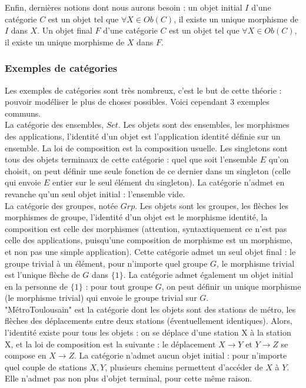 \documentclass{article}
\begin{document}
Enfin, dernières notions dont nous aurons besoin : un objet initial $I$ d'une catégorie $C$
est un objet tel que $ \forall X \in Ob(C)$, il existe un unique morphisme de $I$ dans $X$. Un objet final $F$ d'une catégorie $C$ est un objet tel que $ \forall X \in Ob(C)$, il existe un unique morphisme de $ X$ dans $F$.

\subsubsection{Exemples de catégories}

Les exemples de catégories sont très nombreux, c'est le but de cette théorie : pouvoir modéliser le plus de choses possibles. Voici cependant 3 exemples communs. \\  
La catégorie des ensembles, $Set$. Les objets sont des ensembles, les morphismes des applications, l'identité d'un objet est l'application identité définie sur un ensemble. La loi de composition est la composition usuelle. Les singletons sont tous des objets terminaux de cette catégorie : quel que soit l'ensemble $E$ qu'on choisit, on peut définir une seule fonction de ce dernier dans un singleton (celle qui envoie $E$ entier sur le seul élément du singleton). La catégorie n'admet en revanche qu'un seul objet initial : l'ensemble vide.  
\\ 
La catégorie des groupes, notée $Grp$. Les objets sont les groupes, les flèches les morphismes de groupe, l'identité d'un objet est le morphisme identité, la composition est celle des morphismes (attention, syntaxtiquement ce n'est pas celle des applications, puisqu'une composition de morphisme est un morphisme, et non pas une simple application). Cette catégorie admet un seul objet final : le groupe trivial à un élément, pour n'importe quel groupe $G$, le morphisme trivial est l'unique flèche de $G$ dans $\{ 1 \}$. La catégorie admet également un objet initial en la personne de $\{ 1 \}$ : pour tout groupe $G$, on peut définir un unique morphisme (le morphisme trivial) qui envoie le groupe trivial sur $G$.
\\ 
"MétroToulousain" est la catégorie dont les objets sont des stations de métro, les flèches des déplacements entre deux stations (éventuellement identiques). Alors, l'identité existe pour tous les objets : on se déplace d'une station X à la station X, et la loi de composition est la suivante :  le déplacement $X \rightarrow Y$ et $ Y \rightarrow Z$ se compose en $X \rightarrow Z$. La catégorie n'admet aucun objet initial : pour n'importe quel couple de stations $X,Y$, plusieurs chemins permettent d'accéder de $X$ à $Y$. Elle n'admet pas non plus d'objet terminal, pour cette même raison.
\end{document}
